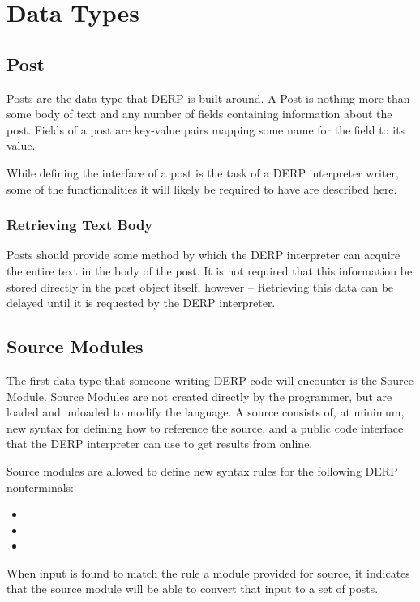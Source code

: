 \section{Data Types}

\subsection{Post}
Posts are the data type that DERP is built around. A Post is nothing more than some body
of text and any number of fields containing information about the post. Fields of a post
are key-value pairs mapping some name for the field to its value.

While defining the interface of a post is the task of a DERP interpreter writer, some of
the functionalities it will likely be required to have are described here.

\subsubsection{Retrieving Text Body}
Posts should provide some method by which the DERP interpreter can acquire the entire
text in the body of the post. It is not required that this information be stored directly
in the post object itself, however -- Retrieving this data can be delayed until it is
requested by the DERP interpreter.

\subsection{Source Modules}\label{sourcemodules}
The first data type that someone writing DERP code will encounter is the Source Module.
Source Modules are not created directly by the programmer, but are loaded and unloaded to
modify the language. A source consists of, at minimum, new syntax for defining how to
reference the source, and a public code interface that the DERP interpreter can use to
get results from online.

Source modules are allowed to define new syntax rules for the following DERP nonterminals:
\begin{itemize}
\item {}
\item {}
\item {}
\end{itemize}
When input is found to match the rule a module provided for source, it indicates that the
source module will be able to convert that input to a set of posts.

